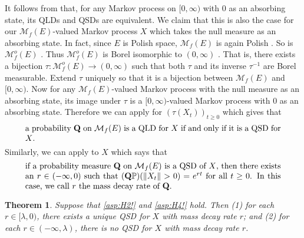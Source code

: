\documentclass[12pt,a4paper]{amsart}
\numberwithin{equation}{section}
\theoremstyle{plain}
\newtheorem{thm}{Theorem}[section]
\theoremstyle{definition}
\theoremstyle{remark}
\begin{document}
	It follows from \cite[Proposition 1]{MeleardVillemonais2012Quasi-stationary} that, for any Markov process on $[0,\infty)$ with $0$ as an absorbing state, its QLDs and QSDs are equivalent.
	We claim that this is also the case for our $\mathcal M_f(E)$-valued Markov process $X$ which takes the null measure as an absorbing state. 
	In fact, since $E$ is Polish space, $\mathcal M_f(E)$ is again Polish \cite[Lemma 4.3]{Kallenberg2017Random}.
	So is $\mathcal M^o_f(E)$ \cite[Theorem A1.2]{Kallenberg2002Foundations}. 
	Thus $\mathcal M^o_f(E)$ is Borel isomorphic to $(0,\infty)$ \cite[Theorem A.1.6]{Kallenberg2002Foundations}.
	That is, there exists a bijection $\tau: \mathcal M^o_f(E) \to (0,\infty)$ such that both $\tau$ and its inverse $\tau^{-1}$ are Borel measurable. 
	Extend $\tau$ uniquely so that it is a bijection between $\mathcal M_f(E)$ and $[0,\infty)$. 
	Now for any $\mathcal M_f(E)$-valued Markov process with the null measure as an absorbing state, its image under $\tau$ is a $[0,\infty)$-valued Markov process with $0$ as an absorbing state. 
	Therefore we can apply \cite[Proposition 1]{MeleardVillemonais2012Quasi-stationary} for $(\tau(X_t))_{t\geq 0}$ which gives that 
\begin{equation} \label{eq:S.1}
\begin{minipage}{0.9\textwidth}
	a probability $\mathbf Q$ on $\mathcal M_f(E)$ is a QLD for $X$ if and only if it is a QSD for $X$.
\end{minipage}
\end{equation}
	Similarly, we can apply \cite[Proposition 2]{MeleardVillemonais2012Quasi-stationary} to $X$ which says that
\begin{equation} \label{eq:S.2}
\begin{minipage}{0.9\textwidth}
	if a probability measure $\mathbf Q$ on $\mathcal M_f(E)$ is a QSD of $X$, then there exists an $r\in (-\infty,0)$ such that $(\mathbf Q\mathbb P)(\|X_t\|>0) = e^{rt}$ for all $t\geq 0$.
	In this case, we call $r$ the mass decay rate of $\mathbf Q$.
\end{minipage}
\end{equation}
	
\begin{thm} \label{thm:QSD}
	Suppose that \eqref{asp:H2!} and \eqref{asp:H4!} hold. 
	Then (1) for each $r \in [\lambda, 0)$, there exists a unique QSD for $X$ with mass decay rate $r$;
	and (2) for each $r\in (-\infty, \lambda)$, there is no QSD for $X$ with mass decay rate $r$.
\end{thm}
\end{document}
